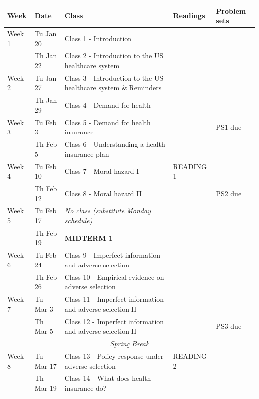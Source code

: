 \documentclass[12pt]{article}
\begin{document}
  \centering
  \scriptsize
  \renewcommand{\arraystretch}{1.15}
  \begin{tabularx}{\linewidth}{l l X l l}
  \hline
  \textbf{Week} & \textbf{Date} & \textbf{Class} & \textbf{Readings} & \textbf{Problem sets} \\
  \hline
  
  Week 1 
  & Tu Jan 20 & Class 1 - Introduction &  &  \\
  & Th Jan 22 & Class 2 - Introduction to the US healthcare system &  &  \\
  
  Week 2
  & Tu Jan 27 & Class 3 - Introduction to the US healthcare system \& Reminders &  &  \\
  & Th Jan 29 & Class 4 - Demand for health &  &  \\
  
  Week 3
  & Tu Feb 3 & Class 5 - Demand for health insurance &  & PS1 due \\
  & Th Feb 5 & Class 6 - Understanding a health insurance plan &  &  \\
  
  Week 4
  & Tu Feb 10 & Class 7 - Moral hazard I & READING 1 &  \\
  & Th Feb 12 & Class 8 - Moral hazard II &  & PS2 due \\
  
  Week 5
  & Tu Feb 17 & \textit{No class (substitute Monday schedule)} &  &  \\
  & Th Feb 19 & \textbf{MIDTERM 1} &  &  \\
  
  Week 6
  & Tu Feb 24 & Class 9 - Imperfect information and adverse selection &  &  \\
  & Th Feb 26 & Class 10 - Empirical evidence on adverse selection &  &  \\
  
  Week 7
  & Tu Mar 3 & Class 11 - Imperfect information and adverse selection II &  &  \\
  & Th Mar 5 & Class 12 - Imperfect information and adverse selection II &  & PS3 due \\
  
  \hline
  \multicolumn{5}{c}{\textit{Spring Break}} \\
  \hline
  
  Week 8
  & Tu Mar 17 & Class 13 - Policy response under adverse selection & READING 2 &  \\
  & Th Mar 19 & Class 14 - What does health insurance do? &  &  \\
  

\end{tabularx}
\end{document}
